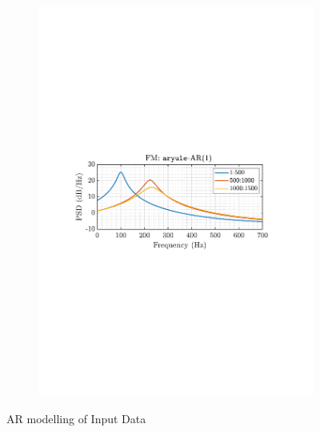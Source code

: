 \documentclass[12pt]{article}
\begin{document}
\begin{figure}[H]
\begin{subfigure}{0.49\textwidth}
					\includegraphics[trim={2.2cm 11.2cm 3.00cm  11.2cm}, clip, width=\textwidth]{../MATLAB/figures/q3_2a_fig04.pdf} 
					\captionsetup{justification=centering}
				\end{subfigure}
				
				\captionsetup{justification=centering}
				\caption{AR modelling of Input Data}
				\label{fig: 3-2a-AR-models}
			\end{figure}
\end{document}
